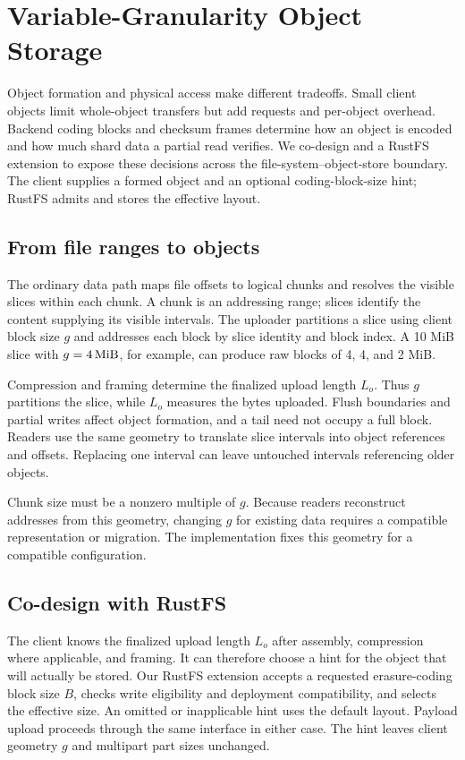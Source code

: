 \section{Variable-Granularity Object Storage}
\label{sec:layout}

Object formation and physical access make different tradeoffs. Small
client objects limit whole-object transfers but add requests and
per-object overhead. Backend coding blocks and checksum frames determine
how an object is encoded and how much shard data a partial read verifies.
We co-design \sys and a RustFS extension to expose these decisions across
the file-system--object-store boundary. The client supplies a formed
object and an optional coding-block-size hint; RustFS admits and stores
the effective layout.

\subsection{From file ranges to objects}

The ordinary data path maps file offsets to logical chunks and resolves
the visible slices within each chunk. A chunk is an addressing range;
slices identify the content supplying its visible intervals. The uploader
partitions a slice using client block size $g$ and addresses each block
by slice identity and block index. A 10 MiB slice with $g=4\,\mathrm{MiB}$,
for example, can produce raw blocks of 4, 4, and 2 MiB.

Compression and framing determine the finalized upload length $L_o$.
Thus $g$ partitions the slice, while $L_o$ measures the bytes uploaded.
Flush boundaries and partial writes affect object formation, and a tail
need not occupy a full block. Readers use the same geometry to translate
slice intervals into object references and offsets. Replacing one
interval can leave untouched intervals referencing older objects.

Chunk size must be a nonzero multiple of $g$. Because readers reconstruct
addresses from this geometry, changing $g$ for existing data requires
a compatible representation or migration. The implementation fixes this
geometry for a compatible configuration.

\subsection{Co-design with RustFS}

The client knows the finalized upload length $L_o$ after assembly,
compression where applicable, and framing. It can therefore choose a
hint for the object that will actually be stored. Our RustFS extension
accepts a requested erasure-coding block size $B$, checks write eligibility
and deployment compatibility, and selects the effective size. An omitted
or inapplicable hint uses the default layout. Payload upload proceeds
through the same interface in either case. The hint leaves client
geometry $g$ and multipart part sizes unchanged.

